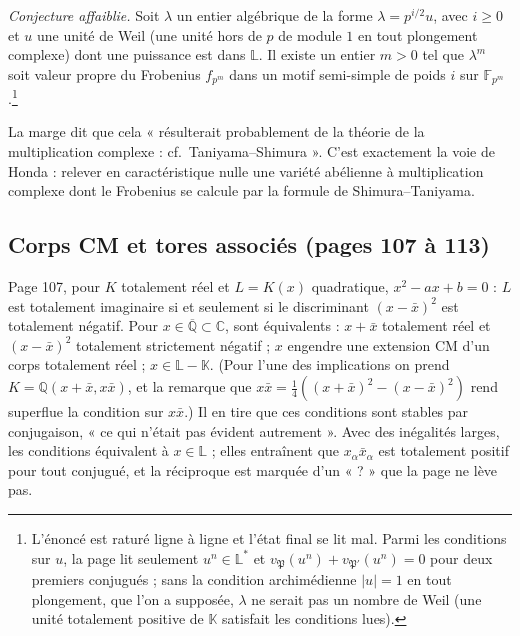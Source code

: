 \documentclass[11pt,a4paper]{article}
\begin{document}
\emph{Conjecture affaiblie.} Soit $\lambda$ un entier algébrique de la forme
$\lambda = p^{i/2}u$, avec $i \geqslant 0$ et $u$ une unité de Weil (une unité
hors de $p$ de module $1$ en tout plongement complexe) dont une puissance est
dans $\mathbb{L}$. Il existe un entier $m > 0$ tel que $\lambda^{m}$ soit valeur
propre du Frobenius $f_{p^{m}}$ dans un motif semi-simple de poids $i$ sur
$\mathbb{F}_{p^{m}}$.\footnote{L'énoncé est raturé ligne à ligne et l'état final
se lit mal. Parmi les conditions sur $u$, la page lit seulement $u^{n} \in
\mathbb{L}^{*}$ et $v_{\mathfrak{P}}(u^{n}) + v_{\mathfrak{P}'}(u^{n}) = 0$ pour
deux premiers conjugués ; sans la condition archimédienne $|u| = 1$ en tout
plongement, que l'on a supposée, $\lambda$ ne serait pas un nombre de Weil (une
unité totalement positive de $\mathbb{K}$ satisfait les conditions lues).}

La marge dit que cela « résulterait probablement de la théorie de la
multiplication complexe : cf.\ Taniyama--Shimura ». C'est exactement la voie de
Honda : relever en caractéristique nulle une variété abélienne à multiplication
complexe dont le Frobenius se calcule par la formule de Shimura--Taniyama.

\subsection*{Corps CM et tores associés (pages 107 à 113)}

Page 107, pour $K$ totalement réel et $L = K(x)$ quadratique,
$x^{2} - ax + b = 0$ : $L$ est totalement imaginaire si et seulement si le
discriminant $(x - \bar{x})^{2}$ est totalement négatif. Pour $x \in
\overline{\mathbb{Q}} \subset \mathbb{C}$, sont équivalents : $x + \bar{x}$
totalement réel et $(x - \bar{x})^{2}$ totalement strictement négatif ; $x$
engendre une extension CM d'un corps totalement réel ; $x \in \mathbb{L} -
\mathbb{K}$. (Pour l'une des implications on prend $K = \mathbb{Q}(x + \bar{x},
x\bar{x})$, et la remarque que $x\bar{x} = \tfrac{1}{4}((x + \bar{x})^{2} - (x -
\bar{x})^{2})$ rend superflue la condition sur $x\bar{x}$.) Il en tire que ces
conditions sont stables par conjugaison, « ce qui n'était pas évident
autrement ». Avec des inégalités larges, les conditions équivalent à $x \in
\mathbb{L}$ ; elles entraînent que $x_{\alpha}\bar{x}_{\alpha}$ est totalement
positif pour tout conjugué, et la réciproque est marquée d'un « ? » que la page
ne lève pas.
\end{document}
